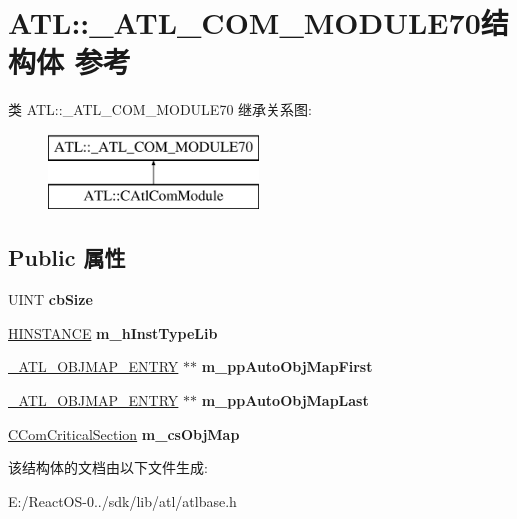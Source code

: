 \hypertarget{struct_a_t_l_1_1___a_t_l___c_o_m___m_o_d_u_l_e70}{}\section{A\+TL\+:\+:\+\_\+\+A\+T\+L\+\_\+\+C\+O\+M\+\_\+\+M\+O\+D\+U\+L\+E70结构体 参考}
\label{struct_a_t_l_1_1___a_t_l___c_o_m___m_o_d_u_l_e70}
类 A\+TL\+:\+:\+\_\+\+A\+T\+L\+\_\+\+C\+O\+M\+\_\+\+M\+O\+D\+U\+L\+E70 继承关系图\+:\begin{figure}[H]
\begin{center}
\leavevmode
\includegraphics[height=2.000000cm]{struct_a_t_l_1_1___a_t_l___c_o_m___m_o_d_u_l_e70}
\end{center}
\end{figure}
\subsection*{Public 属性}
\begin{DoxyCompactItemize}
\item 
\mbox{\label{struct_a_t_l_1_1___a_t_l___c_o_m___m_o_d_u_l_e70_a0be4a3deb2909d9a41b2aeb7a96b0561}} 
U\+I\+NT {\bfseries cb\+Size}
\item 
\mbox{\label{struct_a_t_l_1_1___a_t_l___c_o_m___m_o_d_u_l_e70_a005c131d0d609bb6f63c6b7d3438bfff}} 
\hyperlink{interfacevoid}{H\+I\+N\+S\+T\+A\+N\+CE} {\bfseries m\+\_\+h\+Inst\+Type\+Lib}
\item 
\mbox{\label{struct_a_t_l_1_1___a_t_l___c_o_m___m_o_d_u_l_e70_a6fb5bb885d4360163a9ebdc17adc198e}} 
\hyperlink{struct_a_t_l_1_1___a_t_l___o_b_j_m_a_p___e_n_t_r_y30}{\+\_\+\+A\+T\+L\+\_\+\+O\+B\+J\+M\+A\+P\+\_\+\+E\+N\+T\+RY} $\ast$$\ast$ {\bfseries m\+\_\+pp\+Auto\+Obj\+Map\+First}
\item 
\mbox{\label{struct_a_t_l_1_1___a_t_l___c_o_m___m_o_d_u_l_e70_a41875f4872025cae0e21dbd6d4e867d9}} 
\hyperlink{struct_a_t_l_1_1___a_t_l___o_b_j_m_a_p___e_n_t_r_y30}{\+\_\+\+A\+T\+L\+\_\+\+O\+B\+J\+M\+A\+P\+\_\+\+E\+N\+T\+RY} $\ast$$\ast$ {\bfseries m\+\_\+pp\+Auto\+Obj\+Map\+Last}
\item 
\mbox{\label{struct_a_t_l_1_1___a_t_l___c_o_m___m_o_d_u_l_e70_a72852f6fcda9cf8417b629ee7f9ad51c}} 
\hyperlink{class_a_t_l_1_1_c_com_critical_section}{C\+Com\+Critical\+Section} {\bfseries m\+\_\+cs\+Obj\+Map}
\end{DoxyCompactItemize}


该结构体的文档由以下文件生成\+:\begin{DoxyCompactItemize}
\item 
E\+:/\+React\+O\+S-\/0../sdk/lib/atl/atlbase.\+h\end{DoxyCompactItemize}
